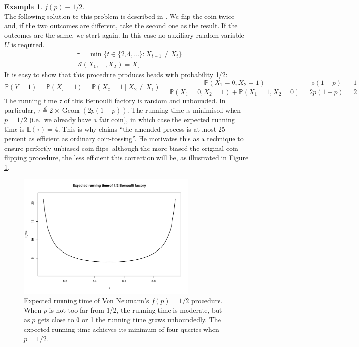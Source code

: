 \documentclass{article}
\theoremstyle{definition}
\newtheorem{example}{Example}
\newcommand{\PR}{\mathbb{P}}
\newcommand{\E}{\mathbb{E}}
\newcommand{\eqdist}{\overset{d}{=}}
\newcommand{\Geom}{\operatorname{Geom}}
\newcommand{\A}{\mathcal{A}}
\begin{document}
\begin{example}\label{ex:bf_half}
$f(p) \equiv 1/2$.\\
The following solution to this problem is described in \citet{vonneumann1951}.
We flip the coin twice and, if the two outcomes are different, take the second one as the result. If the outcomes are the same, we start again.
In this case no auxiliary random variable $U$ is required.
\begin{align*}
& \tau = \min\{ t \in \{2,4,\dots\} : X_{t-1} \neq X_t \} \\
& \A(X_1,\dots,X_T) = X_\tau
\end{align*}
It is easy to show that this procedure produces heads with probability 1/2:
\begin{equation*}
\PR(Y=1) = \PR(X_\tau = 1) = \PR(X_2 = 1 \mid X_2\neq X_1) = \frac{\PR(X_1 = 0, X_2 = 1)}{\PR(X_1 = 0, X_2 = 1) + \PR(X_1 = 1, X_2 = 0)} = \frac{p(1-p)}{2p(1-p)} = \frac{1}{2}
\end{equation*}
The running time $\tau$ of this Bernoulli factory is random and unbounded. In particular, 
$\tau \eqdist 2\times\Geom(2p(1-p))$. The running time is minimised when $p=1/2$ (i.e.\ we already have a fair coin), in which case the expected running time is $\E(\tau)=4$. This is why \citet{vonneumann1951} claims ``the amended process is at most 25 percent as efficient as ordinary coin-tossing''. He motivates this as a technique to ensure perfectly unbiased coin flips, although the more biased the original coin flipping procedure, the less efficient this correction will be, as illustrated in Figure \ref{fig:vonneumann_runtime}.
\begin{figure}
\centering
\includegraphics[width=0.8\textwidth]{vonneu_runtime.pdf}
\caption{Expected running time of Von Neumann's $f(p)=1/2$ procedure. When $p$ is not too far from 1/2, the running time is moderate, but as $p$ gets close to 0 or 1 the running time grows unboundedly. The expected running time achieves its minimum of four queries when $p=1/2$.}\label{fig:vonneumann_runtime}
\end{figure}
\end{example}
\end{document}
